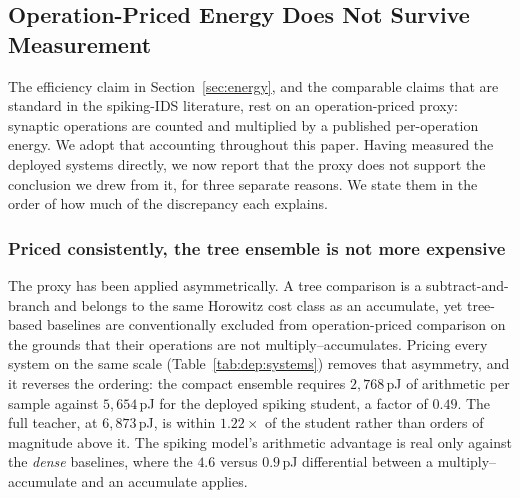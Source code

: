 
\subsection{Operation-Priced Energy Does Not Survive Measurement}
\label{sec:vi:accounting}

The efficiency claim in Section~\ref{sec:energy}, and the comparable claims that
are standard in the spiking-IDS literature, rest on an operation-priced proxy:
synaptic operations are counted and multiplied by a published per-operation
energy. We adopt that accounting throughout this paper. Having measured the
deployed systems directly, we now report that the proxy does not support the
conclusion we drew from it, for three separate reasons. We state them in the
order of how much of the discrepancy each explains.

\subsubsection{Priced consistently, the tree ensemble is not more expensive}
The proxy has been applied asymmetrically. A tree comparison is a
subtract-and-branch and belongs to the same Horowitz cost class as an
accumulate, yet tree-based baselines are conventionally excluded from
operation-priced comparison on the grounds that their operations are not
multiply--accumulates. Pricing every system on the same scale
(Table~\ref{tab:dep:systems}) removes that asymmetry, and it reverses the
ordering: the compact ensemble requires $2{,}768$\,pJ of arithmetic per sample
against $5{,}654$\,pJ for the deployed spiking student, a factor of $0.49$. The
full teacher, at $6{,}873$\,pJ, is within $1.22\times$ of the student rather than
orders of magnitude above it. The spiking model's arithmetic advantage is real
only against the \emph{dense} baselines, where the $4.6$ versus $0.9$\,pJ
differential between a multiply--accumulate and an accumulate applies.

